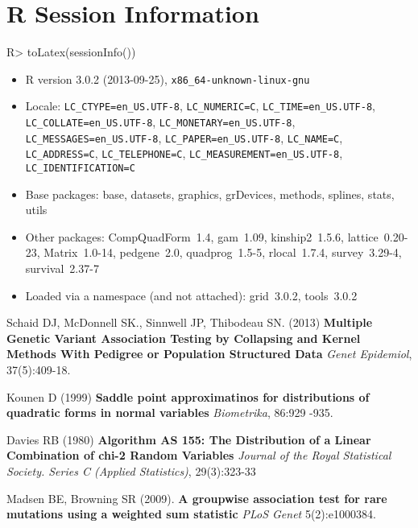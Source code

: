 \documentclass[letterpaper]{article}
\begin{document}
\section{R Session Information}
\begin{Schunk}
\begin{Sinput}
R> toLatex(sessionInfo())
\end{Sinput}
\begin{itemize}\raggedright
  \item R version 3.0.2 (2013-09-25), \verb|x86_64-unknown-linux-gnu|
  \item Locale: \verb|LC_CTYPE=en_US.UTF-8|, \verb|LC_NUMERIC=C|, \verb|LC_TIME=en_US.UTF-8|, \verb|LC_COLLATE=en_US.UTF-8|, \verb|LC_MONETARY=en_US.UTF-8|, \verb|LC_MESSAGES=en_US.UTF-8|, \verb|LC_PAPER=en_US.UTF-8|, \verb|LC_NAME=C|, \verb|LC_ADDRESS=C|, \verb|LC_TELEPHONE=C|, \verb|LC_MEASUREMENT=en_US.UTF-8|, \verb|LC_IDENTIFICATION=C|
  \item Base packages: base, datasets, graphics, grDevices, methods, splines, stats,
    utils
  \item Other packages: CompQuadForm~1.4, gam~1.09, kinship2~1.5.6, lattice~0.20-23,
    Matrix~1.0-14, pedgene~2.0, quadprog~1.5-5, rlocal~1.7.4, survey~3.29-4,
    survival~2.37-7
  \item Loaded via a namespace (and not attached): grid~3.0.2, tools~3.0.2
\end{itemize}\end{Schunk}

\begin{thebibliography}{}
Schaid DJ, McDonnell SK., Sinnwell JP, Thibodeau SN. (2013)
{\bf Multiple Genetic Variant Association Testing by Collapsing and Kernel Methods 
  With Pedigree or Population Structured Data} {\em Genet Epidemiol}, 37(5):409-18.

Kounen D (1999) {\bf Saddle point approximatinos for distributions of
quadratic forms in normal variables} {\em Biometrika}, 86:929 -935.

Davies RB (1980) {\bf Algorithm AS 155: The Distribution of a Linear Combination
of chi-2 Random Variables}  {\em Journal of the Royal Statistical
Society. Series C (Applied Statistics)}, 29(3):323-33
 
Madsen BE, Browning SR (2009). 
{\bf A groupwise association test for rare mutations using a weighted sum statistic} 
{\em PLoS Genet} 5(2):e1000384.


\end{thebibliography}
   
\end{document}
